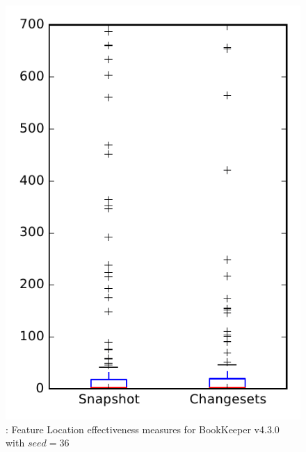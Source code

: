 
\begin{figure}
\centering
\includegraphics[height=0.4\textheight]{figures/flt_seed/rq1_bookkeeper_36}
\caption{\rone: Feature Location effectiveness measures for BookKeeper v4.3.0 with $seed=36$}
\label{fig:flt_seed:rq1:bookkeeper}
\end{figure}
